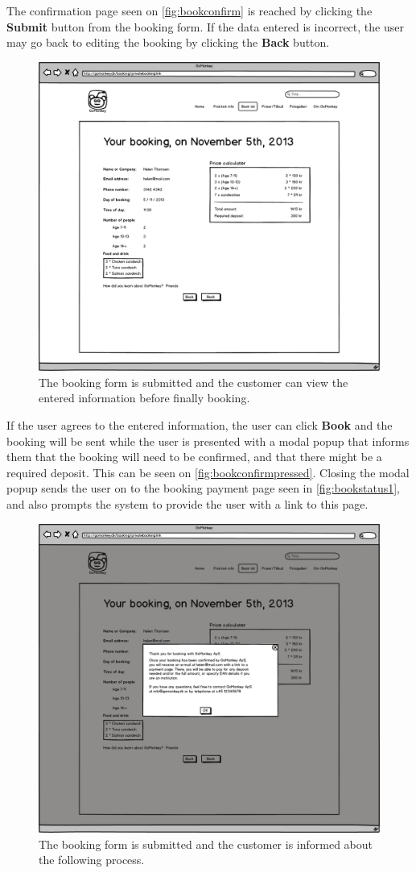 The confirmation page seen on \autoref{fig:bookconfirm} is reached by clicking
the \textbf{Submit} button from the booking form. If the data entered is
incorrect, the user may go back to editing the booking by clicking the
\textbf{Back} button.

\begin{figure}[htbp]
    \centering
        \includegraphics[width=.6\textwidth]{figures/mockup/booking_confirmation.png}
	    \caption{The booking form is submitted and the customer can view the entered information before finally booking.}
        \label{fig:bookconfirm}
\end{figure}

If the user agrees to the entered information, the
user can click \textbf{Book} and the booking will be sent while the user is presented
with a modal popup that informs them that the booking will need to be confirmed,
and that there might be a required deposit. This can be seen on \autoref{fig:bookconfirmpressed}.
Closing the modal popup sends the user on to the booking payment page seen in
\autoref{fig:bookstatus1}, and also prompts the system to provide the user with
a link to this page.

\begin{figure}[htbp]
    \centering
        \includegraphics[width=.6\textwidth]{figures/mockup/booking_confirmation_bookpressed.png}
	    \caption{The booking form is submitted and the customer is informed about the following process.}
        \label{fig:bookconfirmpressed}
\end{figure}


